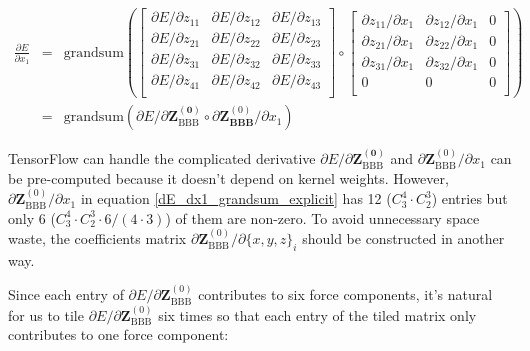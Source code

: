 \begin{eqnarray}
\frac{\partial{E}}{\partial{x_1}} 
& = & 
\mathrm{grandsum}\left(
	\left[\begin{array}{ccc}
		\partial{E} / \partial{z_{11}} & 
		\partial{E} / \partial{z_{12}} &
		\partial{E} / \partial{z_{13}} \\ 
		\partial{E} / \partial{z_{21}} &
		\partial{E} / \partial{z_{22}} &
		\partial{E} / \partial{z_{23}} \\
		\partial{E} / \partial{z_{31}} &
		\partial{E} / \partial{z_{32}} &
		\partial{E} / \partial{z_{33}} \\
		\partial{E} / \partial{z_{41}} &
		\partial{E} / \partial{z_{42}} &
		\partial{E} / \partial{z_{43}} \\
		\end{array}
	\right] 
	\circ 
	\left[\begin{array}{ccc}
		\partial{z_{11}} / \partial{x_1} & 
		\partial{z_{12}} / \partial{x_1} &
		0 \\ 
		\partial{z_{21}} / \partial{x_1} &
		\partial{z_{22}} / \partial{x_1} &
		0 \\
		\partial{z_{31}} / \partial{x_1} &
		\partial{z_{32}} / \partial{x_1} &
		0 \\
		0 &
		0 &
		0 \\	
		\end{array}
	\right]
\right) \label{dE_dx1_grandsum_explicit} \\
& = &
\mathrm{grandsum}\left(
	\partial{E} / \partial{\mathbf{Z^{(0)}_{\mathrm{BBB}}}} 
	\circ
	\partial{\mathbf{Z}^{(0)}_{\mathbf{BBB}}} / \partial{x_1}
\right)
\end{eqnarray}

\noindent TensorFlow can handle the complicated derivative 
$\partial{E} / \partial{\mathbf{Z^{(0)}_{\mathrm{BBB}}}}$ and 
$\partial{\mathbf{Z}^{(0)}_{\mathrm{BBB}}} / \partial{x_1}$ can be pre-computed because it 
doesn't depend on kernel weights. 
However, $\partial{\mathbf{Z}^{(0)}_{\mathrm{BBB}}} / \partial{x_1}$ in equation 
\ref{dE_dx1_grandsum_explicit} has 12 ($C^4_3 \cdot C^3_2$) entries 
but only 6 ($C^4_3 \cdot C^3_2 \cdot 6 / (4 \cdot 3)$) of them are non-zero. 
To avoid unnecessary space waste, the coefficients matrix 
$\partial{\mathbf{Z}^{(0)}_{\mathrm{BBB}}} / \partial{\{x, y, z\}_i}$ should be constructed in
another way.

Since each entry of $\partial{E} / \partial{\mathbf{Z}^{(0)}_{\mathrm{BBB}}}$ contributes 
to six force components, it's natural for us to tile 
$\partial{E} / \partial{\mathbf{Z}^{(0)}_{\mathrm{BBB}}}$ six times so that each entry of the 
tiled matrix only contributes to one force component:

